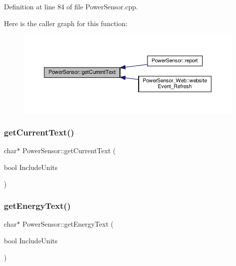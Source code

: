 Definition at line 84 of file Power\+Sensor.\+cpp.

Here is the caller graph for this function\+:
\nopagebreak
\begin{figure}[H]
\begin{center}
\leavevmode
\includegraphics[width=350pt]{class_power_sensor_ac3795cfd4910157ca6046272d53cab1f_icgraph}
\end{center}
\end{figure}
\mbox{\label{class_power_sensor_a44f7097631cdbaf30cfbc210ea18ff6a}} 
\subsubsection{\texorpdfstring{get\+Current\+Text()}{getCurrentText()}\hspace{0.1cm}{\footnotesize\ttfamily [2/2]}}
{\footnotesize\ttfamily char$\ast$ Power\+Sensor\+::get\+Current\+Text (\begin{DoxyParamCaption}\item[{bool}]{Include\+Units }\end{DoxyParamCaption})}

\mbox{\label{class_power_sensor_a047668dfa417e539e6e28913b1f8737b}} 
\subsubsection{\texorpdfstring{get\+Energy\+Text()}{getEnergyText()}\hspace{0.1cm}{\footnotesize\ttfamily [1/2]}}
{\footnotesize\ttfamily char$\ast$ Power\+Sensor\+::get\+Energy\+Text (\begin{DoxyParamCaption}\item[{bool}]{Include\+Units }\end{DoxyParamCaption})}

